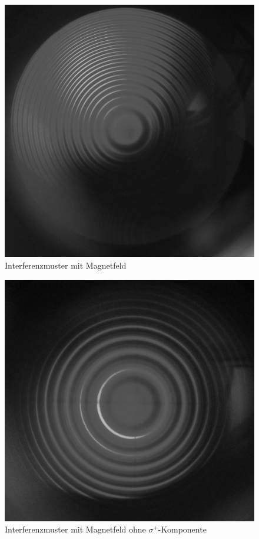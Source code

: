 \begin{figure}
\centering
\includegraphics[scale=0.1]{data/bilder_okular/bild_6_edit.jpg}
\caption{Interferenzmuster mit Magnetfeld}
\label{fig:bildlongmitB}
\end{figure}
\begin{figure}
\centering
\includegraphics[scale=0.1]{data/bilder_okular/bild_7_edit.jpg}
\caption{Interferenzmuster mit Magnetfeld ohne $\sigma^+$-Komponente}
\label{fig:bildlongmitBsigmaplus}
\end{figure}
